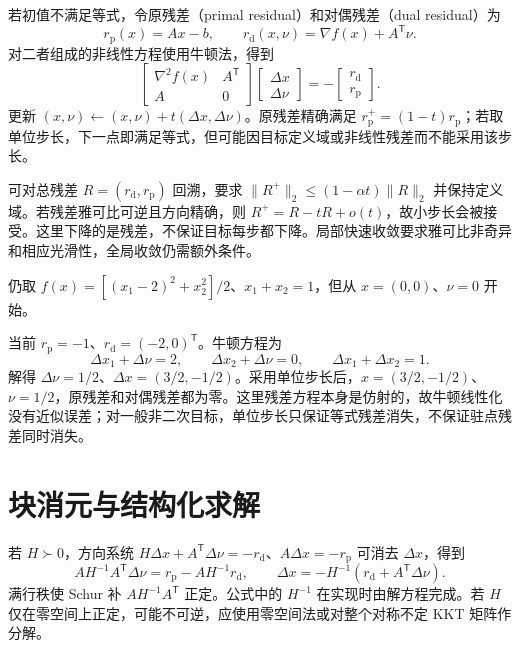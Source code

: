 若初值不满足等式，令原残差（primal residual）和对偶残差（dual residual）为
\[
 r_{\mathrm p}(x)=Ax-b,\qquad
 r_{\mathrm d}(x,\nu)=\nabla f(x)+A^{\mathsf T}\nu.
\]
对二者组成的非线性方程使用牛顿法，得到
\[
 \begin{bmatrix}\nabla^2f(x)&A^{\mathsf T}\\A&0\end{bmatrix}
 \begin{bmatrix}\Delta x\\\Delta\nu\end{bmatrix}
 =-\begin{bmatrix}r_{\mathrm d}\\r_{\mathrm p}\end{bmatrix}.
\]
更新 $(x,\nu)\leftarrow(x,\nu)+t(\Delta x,\Delta\nu)$。原残差精确满足 $r_{\mathrm p}^{+}=(1-t)r_{\mathrm p}$；若取单位步长，下一点即满足等式，但可能因目标定义域或非线性残差而不能采用该步长。

可对总残差 $R=(r_{\mathrm d},r_{\mathrm p})$ 回溯，要求 $\|R^+\|_2\leq(1-\alpha t)\|R\|_2$ 并保持定义域。若残差雅可比可逆且方向精确，则 $R^+=R-tR+o(t)$，故小步长会被接受。这里下降的是残差，不保证目标每步都下降。局部快速收敛要求雅可比非奇异和相应光滑性，全局收敛仍需额外条件。

\begin{example}[从不可行点同时修正两个残差]
仍取 $f(x)=[(x_1-2)^2+x_2^2]/2$、$x_1+x_2=1$，但从 $x=(0,0)$、$\nu=0$ 开始。
\end{example}
\begin{solve}
当前 $r_{\mathrm p}=-1$、$r_{\mathrm d}=(-2,0)^{\mathsf T}$。牛顿方程为
\[
 \Delta x_1+\Delta\nu=2,\qquad
 \Delta x_2+\Delta\nu=0,\qquad
 \Delta x_1+\Delta x_2=1.
\]
解得 $\Delta\nu=1/2$、$\Delta x=(3/2,-1/2)$。采用单位步长后，$x=(3/2,-1/2)$、$\nu=1/2$，原残差和对偶残差都为零。这里残差方程本身是仿射的，故牛顿线性化没有近似误差；对一般非二次目标，单位步长只保证等式残差消失，不保证驻点残差同时消失。
\end{solve}

\section{块消元与结构化求解}

若 $H\succ0$，方向系统 $H\Delta x+A^{\mathsf T}\Delta\nu=-r_{\mathrm d}$、$A\Delta x=-r_{\mathrm p}$ 可消去 $\Delta x$，得到
\[
 AH^{-1}A^{\mathsf T}\Delta\nu
 =r_{\mathrm p}-AH^{-1}r_{\mathrm d},\qquad
 \Delta x=-H^{-1}(r_{\mathrm d}+A^{\mathsf T}\Delta\nu).
\]
满行秩使 Schur 补 $AH^{-1}A^{\mathsf T}$ 正定。公式中的 $H^{-1}$ 在实现时由解方程完成。若 $H$ 仅在零空间上正定，可能不可逆，应使用零空间法或对整个对称不定 KKT 矩阵作分解。

